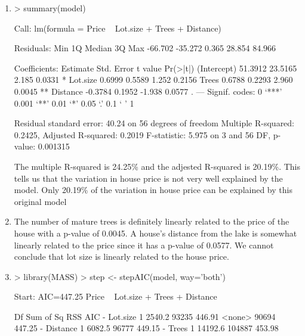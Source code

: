 \documentclass[]{article}
\begin{document}
\begin{enumerate}
\begin{enumerate}
\item

\begin{Schunk}
\begin{Sinput}
> summary(model)
\end{Sinput}
\begin{Soutput}
Call:
lm(formula = Price ~ Lot.size + Trees + Distance)

Residuals:
    Min      1Q  Median      3Q     Max 
-66.702 -35.272   0.365  28.854  84.966 

Coefficients:
            Estimate Std. Error t value Pr(>|t|)   
(Intercept)  51.3912    23.5165   2.185   0.0331 * 
Lot.size      0.6999     0.5589   1.252   0.2156   
Trees         0.6788     0.2293   2.960   0.0045 **
Distance     -0.3784     0.1952  -1.938   0.0577 . 
---
Signif. codes:  0 ‘***’ 0.001 ‘**’ 0.01 ‘*’ 0.05 ‘.’ 0.1 ‘ ’ 1

Residual standard error: 40.24 on 56 degrees of freedom
Multiple R-squared:  0.2425,	Adjusted R-squared:  0.2019 
F-statistic: 5.975 on 3 and 56 DF,  p-value: 0.001315
\end{Soutput}
\end{Schunk}

The multiple R-squared is 24.25\% and the adjested R-squared is 20.19\%. This tells us that the variation in house price is not very well explained by the model. Only 20.19\% of the variation in house price can be explained by this original model

\item

The number of mature trees is definitely linearly related to the price of the house with a p-value of 0.0045. A house's distance from the lake is somewhat linearly related to the price since it has a p-value of 0.0577. We cannot conclude that lot size is linearly related to the house price. 

\item

\begin{Schunk}
\begin{Sinput}
> library(MASS)
> step <- stepAIC(model, way='both')
\end{Sinput}
\begin{Soutput}
Start:  AIC=447.25
Price ~ Lot.size + Trees + Distance

           Df Sum of Sq    RSS    AIC
- Lot.size  1    2540.2  93235 446.91
<none>                   90694 447.25
- Distance  1    6082.5  96777 449.15
- Trees     1   14192.6 104887 453.98


\end{Soutput}
\end{Schunk}
\end{enumerate}
\end{enumerate}
\end{document}
